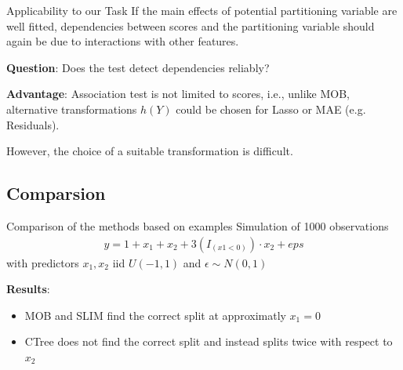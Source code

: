 \documentclass[9pt, xcolor=table]{beamer}
\begin{document}
\begin{frame}{Applicability to our Task}
If the main effects of potential partitioning variable are well fitted, dependencies between scores and the partitioning variable should again be due to interactions with other features.

\vspace{0.5cm}

\textbf{Question}: Does the test detect dependencies reliably?

\vspace{0.5cm}

\textbf{Advantage}:
Association test is not limited to scores, i.e., unlike MOB, alternative transformations $h(Y)$ could be chosen for Lasso or MAE (e.g. Residuals).

However, the choice of a suitable transformation is difficult.


\end{frame}



\subsection{Comparsion}
\begin{frame}{Comparison of the methods based on examples}
 Simulation of 1000 observations  
\begin{align*}
     y = 1 + x_1 + x_2 + 3(I_{(x1<0)}) \cdot x_2 + eps
\end{align*}
with predictors $x_{1},x_{2}$ iid $U(-1,1)$ and $\epsilon \sim N(0,1)$

\vspace{0.5cm}
\textbf{Results}:
\begin{itemize}
    \item MOB and SLIM find the correct split at approximatly $x_1 = 0$
    \item CTree does not find the correct split and instead splits twice with respect to $x_2$ 
\end{itemize}
\end{frame}
\end{document}
